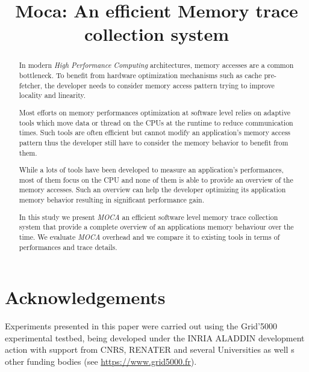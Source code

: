 \documentclass[10pt, conference, compsocconf]{sty/IEEEtran}
\title{Moca: An efficient Memory trace collection system}
\author{\IEEEauthorblockN{David Beniamine, Guillaume Huard}
\IEEEauthorblockA{Univ. Grenoble Alpes, LIG, F-38000 Grenoble, France\\
CNRS, LIG, F-38000 Grenoble, France\\
Inria\\
\{David.Beniamine,Guillaume.Huard\}@Imag.fr}
}
\newcommand{\Input}[1]{}
\newcommand{\Moca}{\emph{MOCA}\xspace}
\begin{document}
\maketitle

\begin{abstract}
    In modern \emph{High Performance Computing} architectures, memory accesses
    are a common bottleneck. To benefit from hardware optimization mechanisms
    such as cache pre-fetcher, the developer needs to consider memory access
    pattern trying to improve locality and linearity.

    Most efforts on memory performances optimization at software level relies
    on adaptive tools which move data or thread on the CPUs at the runtime to
    reduce communication times. Such tools are often efficient but cannot
    modify an application's memory access pattern thus the developer still
    have to consider the memory behavior to benefit from them.

    While a lots of tools have been developed to measure an application's
    performances, most of them focus on the CPU and none of them is able to
    provide an overview of the memory accesses. Such an overview can help the
    developer optimizing its application memory behavior resulting in
    significant performance gain.

    In this study we present \Moca an efficient software level memory trace
    collection system that provide a complete overview of an applications
    memory behaviour over the time. We evaluate \Moca overhead and we compare
    it to existing tools in terms of performances and trace details.

\end{abstract}

\listoftodos
\Input{intro.tex}
\Input{related.tex}
\Input{design.tex}
\Input{experiment.tex}
\Input{cncl.tex}
\section*{Acknowledgements}
Experiments presented in this paper were carried out using the Grid'5000
experimental testbed, being developed under the INRIA ALADDIN development
action with support from CNRS, RENATER and several Universities as well
s other funding bodies (see \url{https://www.grid5000.fr}).



\end{document}
